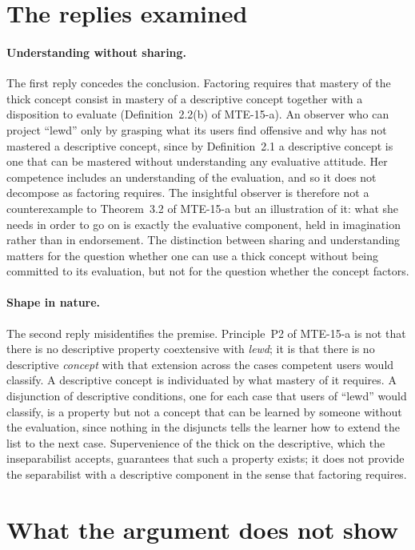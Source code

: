 \documentclass{situationist-preprint}
\begin{document}
\section{The replies examined}

\paragraph{Understanding without sharing.} The first reply concedes the conclusion. Factoring requires that mastery of the thick concept consist in mastery of a descriptive concept together with a disposition to evaluate (Definition~2.2(b) of MTE-15-a). An observer who can project \enquote{lewd} only by grasping what its users find offensive and why has not mastered a descriptive concept, since by Definition~2.1 a descriptive concept is one that can be mastered without understanding any evaluative attitude. Her competence includes an understanding of the evaluation, and so it does not decompose as factoring requires. The insightful observer is therefore not a counterexample to Theorem~3.2 of MTE-15-a but an illustration of it: what she needs in order to go on is exactly the evaluative component, held in imagination rather than in endorsement. The distinction between sharing and understanding matters for the question whether one can use a thick concept without being committed to its evaluation, but not for the question whether the concept factors.

\paragraph{Shape in nature.} The second reply misidentifies the premise. Principle~P2 of MTE-15-a is not that there is no descriptive property coextensive with \emph{lewd}; it is that there is no descriptive \emph{concept} with that extension across the cases competent users would classify. A descriptive concept is individuated by what mastery of it requires. A disjunction of descriptive conditions, one for each case that users of \enquote{lewd} would classify, is a property but not a concept that can be learned by someone without the evaluation, since nothing in the disjuncts tells the learner how to extend the list to the next case. Supervenience of the thick on the descriptive, which the inseparabilist accepts, guarantees that such a property exists; it does not provide the separabilist with a descriptive component in the sense that factoring requires.

\section{What the argument does not show}
\end{document}
